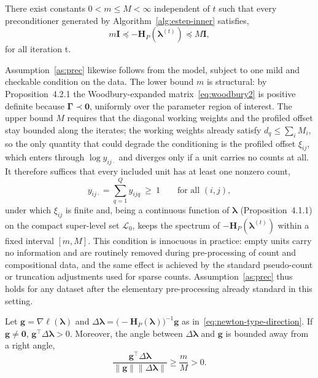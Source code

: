 \begin{assumption}
    There exist constants $0<m\leq M<\infty$ independent of $t$ such that every preconditioner generated by Algorithm~\ref{alg:estep-inner} satisfies,
    \begin{equation}
        m\mathbf{I}\preceq -\mathbf{H}_{P}(\bm{\lambda}^{(t)})\preceq M\mathbf{I},
    \end{equation}
    for all iteration t.
    \label{as:prec}
\end{assumption}
Assumption~\ref{as:prec} likewise follows from the model, subject to one mild and checkable
condition on the data. The lower bound $m$ is structural: by Proposition~4.2.1 the
Woodbury-expanded matrix~\eqref{eq:woodbury2} is positive definite because $\bm{\Gamma}\prec\mathbf 0$,
uniformly over the parameter region of interest. The upper bound $M$ requires that the diagonal
working weights and the profiled offset stay bounded along the iterates; the working weights
already satisfy $d_{q}\le\sum_{i}M_{i}$, so the only quantity that could degrade the conditioning
is the profiled offset $\xi_{ij}$, which enters through $\log y_{ij\cdot}$ and diverges only if a
unit carries no counts at all. It therefore suffices that every included unit has at least one
nonzero count,
\[
y_{ij\cdot}=\sum_{q=1}^{Q}y_{ijq}\ \ge\ 1\qquad\text{for all }(i,j),
\]
under which $\xi_{ij}$ is finite and, being a continuous function of $\bm{\lambda}$
(Proposition~4.1.1) on the compact super-level set $\mathcal{L}_{0}$, keeps the spectrum of
$-\mathbf{H}_{P}(\bm{\lambda}^{(t)})$ within a fixed interval $[m,M]$. This condition is innocuous
in practice: empty units carry no information and are routinely removed during pre-processing of
count and compositional data, and the same effect is achieved by the standard pseudo-count or
truncation adjustments used for sparse counts. Assumption~\ref{as:prec} thus holds for any dataset
after the elementary pre-processing already standard in this setting.
    
\begin{lemma}
    Let $\mathbf{g}=\nabla\ell(\bm{\lambda})$ and $\Delta \bm{\lambda}=\bigl(-\mathbf{H}_{P}(\bm{\lambda})\bigr)^{-1}\mathbf{g}$ as in~\eqref{eq:newton-type-direction}. If $\mathbf{g}\neq \bm{0}$, $\mathbf{g}^{\top}\Delta\bm{\lambda}>0$. Moreover, the angle between $\Delta\bm{\lambda}$ and $\mathbf{g}$ is bounded away from a right angle,
    \begin{equation}
        \frac{\mathbf{g}^{\top}\Delta\bm{\lambda}}{\|\mathbf{g}\|\|\Delta\bm{\lambda}\|}\geq \frac{m}{M}>0.
    \end{equation}
    \label{lem:ascent-direction}
\end{lemma}

